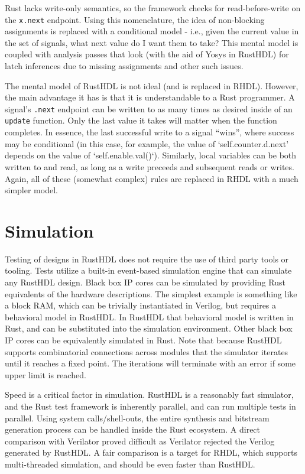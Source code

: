 \documentclass[sigplan,screen,sigconf]{acmart}
\begin{document}
Rust lacks write-only semantics, so the framework checks for read-before-write on the \verb|x.next| 
endpoint.  Using this nomenclature, the idea of non-blocking assignments is replaced with a
 conditional model - i.e., given the current value in the set of signals, what next value do I 
want them to take?  This mental model is coupled with analysis passes that look (with the aid 
of Yosys\cite{b12} in RustHDL) for latch inferences due to missing assignments and other such issues.

The mental model of RustHDL is not ideal (and is replaced in RHDL).  However, the main advantage it has
is that it is understandable to a Rust programmer.  A signal's \verb|.next| endpoint can be written 
to as many times as desired inside of an \verb|update| function.  Only the last value it takes will
matter when the function completes.  In essence, the last successful write to a signal ``wins'', where
success may be conditional (in this case, for example, the value of `self.counter.d.next' depends on 
the value of `self.enable.val()`).  Similarly, local variables can be both written to and read, as long as 
a write preceeds and subsequent reads or writes.  Again, all of these (somewhat complex) rules are replaced
in RHDL with a much simpler model.


\section{Simulation}
Testing of designs in RustHDL does not require the use of third party tools or tooling.  
Tests utilize a built-in event-based simulation engine that can simulate any RustHDL design.
Black box IP cores can be simulated by providing Rust equivalents of the hardware descriptions.
The simplest example is something like a block RAM, which can be trivially instantiated in 
Verilog, but requires a behavioral model in RustHDL.  In RustHDL that behavioral model is 
written in Rust, and can be substituted into the simulation environment.  Other black box
IP cores can be equivalently simulated in Rust.  Note that because RustHDL supports combinatorial
connections across modules that the simulator iterates until it reaches a fixed point.  The 
iterations will terminate with an error if some upper limit is reached.

Speed is a critical factor in simulation.  RustHDL is a reasonably fast simulator, 
and the Rust test framework is inherently parallel, and can run multiple tests in parallel. 
Using system calls/shell-outs, the entire synthesis and bitstream generation process 
can be handled inside the Rust ecosystem.  A direct comparison with Verilator proved difficult
as Verilator rejected the Verilog generated by RustHDL.  A fair comparison is a target for RHDL,
which supports multi-threaded simulation, and should be even faster than RustHDL.
\end{document}
